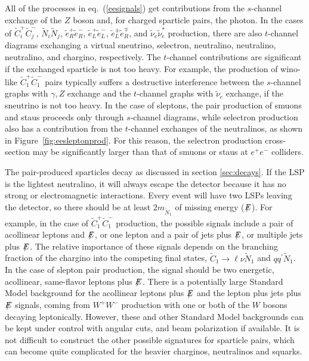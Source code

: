 \documentclass[11pt]{article}
\def\stilde{\widetilde}
\def\NI{\stilde N_1}
\def\Etot{{\slashchar{E}}}
\def\slashchar#1{\setbox0=\hbox{$#1$}           %
   \dimen0=\wd0                                 %
   \setbox1=\hbox{/} \dimen1=\wd1               %
   \ifdim\dimen0>\dimen1                        %
      \rlap{\hbox to \dimen0{\hfil/\hfil}}      %
      #1                                        %
   \else                                        %
      \rlap{\hbox to \dimen1{\hfil$#1$\hfil}}   %
      /                                         %
   \fi}                                        %
\begin{document}
All of the processes in eq.~(\ref{eesignals}) get contributions from the 
$s$-channel exchange of the $Z$ boson and, for charged sparticle pairs, 
the photon. In the cases of $\stilde C_i^+ \stilde C_j^-$, $\stilde N_i 
\stilde N_j$, $\stilde e_R^+ \stilde e_R^-$, $\stilde e_L^+ \stilde 
e_L^-$, $\stilde e_L^\pm \stilde e_R^\mp$, and $\stilde \nu_e \stilde 
\nu_e^*$ production, there are also $t$-channel diagrams exchanging a 
virtual sneutrino, selectron, neutralino, neutralino, neutralino, and 
chargino, respectively. The $t$-channel contributions are significant if 
the exchanged sparticle is not too heavy. For example, the production of 
wino-like $\stilde C_1^+ \stilde C_1^-$ pairs typically suffers a 
destructive interference between the $s$-channel graphs with $\gamma,Z$ 
exchange and the $t$-channel graphs with $\stilde \nu_e$ exchange, if the 
sneutrino is not too heavy. In the case of sleptons, the pair production 
of smuons and staus proceeds only through $s$-channel diagrams, while 
selectron production also has a contribution from the $t$-channel 
exchanges of the neutralinos, as shown in Figure~\ref{fig:eesleptonprod}. 
For this reason, the selectron production cross-section
may be significantly larger than that of
smuons or staus at $e^+e^-$ colliders.

The pair-produced sparticles decay as discussed in section 
\ref{sec:decays}. If the LSP is the lightest neutralino, it will always 
escape the detector because it has no strong or electromagnetic 
interactions. Every event will have two LSPs leaving the detector, so 
there should be at least $2m_{\NI}$ of missing energy ($\Etot$). For 
example, in the case of $\stilde C_1^+ \stilde C_1^-$ production, the 
possible signals include a pair of acollinear leptons and $\Etot$, or one 
lepton and a pair of jets plus $\Etot$, or multiple jets plus $\Etot$. The 
relative importance of these signals depends on the branching fraction of 
the chargino into the competing final states, $\stilde C_1 \rightarrow 
\ell\nu \NI$ and $qq^\prime\NI$. In the case of slepton pair production, 
the signal should be two energetic, acollinear, same-flavor leptons plus 
$\Etot$. There is a potentially large Standard Model background for the 
acollinear leptons plus $\Etot$ and the lepton plus jets plus $\Etot$ 
signals, coming from $W^+W^-$ production with one or both of the $W$ 
bosons decaying leptonically. However, these and other Standard Model 
backgrounds can be kept under control with angular cuts, and beam 
polarization if available. It is not difficult to construct the other 
possible signatures for sparticle pairs, which can become quite 
complicated for the heavier charginos, neutralinos and squarks.
\end{document}
